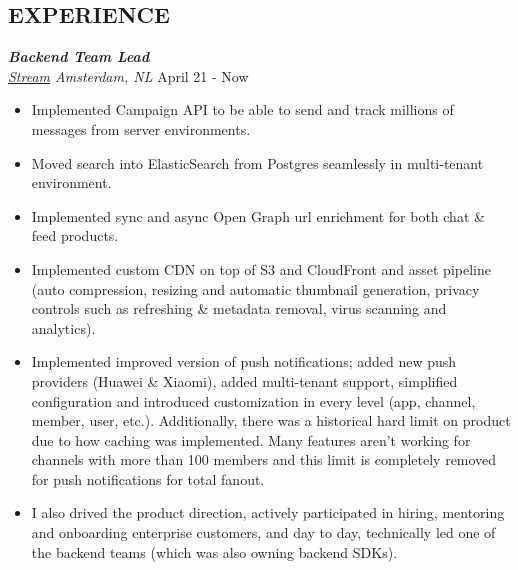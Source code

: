 \documentclass[line, margin]{res}
\begin{document}
\address{\hspace{0.1cm}\href{mailto:elmas.ferhat@gmail.com}{elmas.ferhat@gmail.com}}
\address{\hspace{0.3cm}\href{https://github.com/ferhatelmas}{github.com/ferhatelmas}}

\begin{resume}

\vspace{-0.4cm}

\section{EXPERIENCE}

{\sl \textbf{Backend Team Lead} \\ \href{https://www.getstream.io}{Stream} Amsterdam, NL} \hfill April 21 - Now \\
\vspace{-0.3cm}
\begin{itemize}
  \item Implemented Campaign API to be able to send and track millions of messages from server environments.
  \item Moved search into ElasticSearch from Postgres seamlessly in multi-tenant environment.
  \item Implemented sync and async Open Graph url enrichment for both chat \& feed products.
  \item Implemented custom CDN on top of S3 and CloudFront and asset pipeline (auto compression, resizing and automatic thumbnail generation, privacy controls such as refreshing \& metadata removal, virus scanning and analytics).
  \item Implemented improved version of push notifications; added new push providers (Huawei \& Xiaomi), added multi-tenant support, simplified configuration and introduced customization in every level (app, channel, member, user, etc.). Additionally, there was a historical hard limit on product due to how caching was implemented. Many features aren't working for channels with more than 100 members and this limit is completely removed for push notifications for total fanout.
  \item I also drived the product direction, actively participated in hiring, mentoring and onboarding enterprise customers, and day to day, technically led one of the backend teams (which was also owning backend SDKs).


\end{itemize}
\end{resume}
\end{document}

